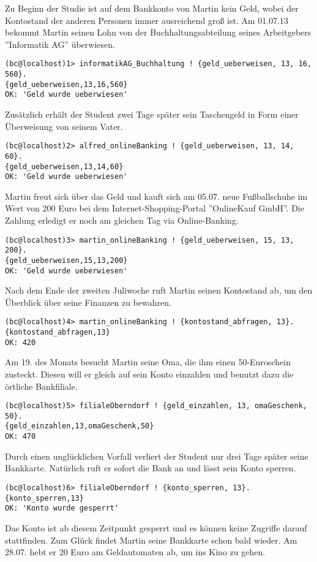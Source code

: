 Zu Beginn der Studie ist auf dem Bankkonto von Martin kein Geld, wobei der Kontostand der anderen Personen immer ausreichend groß ist. Am 01.07.13 bekommt Martin seinen Lohn von der Buchhaltungsabteilung seines Arbeitgebers ''Informatik AG'' überwiesen. 
\begin{lstlisting}
(bc@localhost)1> informatikAG_Buchhaltung ! {geld_ueberweisen, 13, 16, 560}.    
{geld_ueberweisen,13,16,560}
OK: 'Geld wurde ueberwiesen'
\end{lstlisting}
Zusätzlich erhält der Student zwei Tage später sein Taschengeld in Form einer Überweisung von seinem Vater.
\begin{lstlisting}
(bc@localhost)2> alfred_onlineBanking ! {geld_ueberweisen, 13, 14, 60}.        
{geld_ueberweisen,13,14,60}
OK: 'Geld wurde ueberwiesen'
\end{lstlisting}
Martin freut sich über das Geld und kauft sich am 05.07. neue Fußballschuhe im Wert von 200 Euro bei dem Internet-Shopping-Portal ''OnlineKauf GmbH''. Die Zahlung erledigt er noch am gleichen Tag via Online-Banking.
\begin{lstlisting}
(bc@localhost)3> martin_onlineBanking ! {geld_ueberweisen, 15, 13, 200}.        
{geld_ueberweisen,15,13,200}              
OK: 'Geld wurde ueberwiesen'
\end{lstlisting}
Nach dem Ende der zweiten Juliwoche ruft Martin seinen Kontostand ab, um den Überblick über seine Finanzen zu bewahren.
\begin{lstlisting}
(bc@localhost)4> martin_onlineBanking ! {kontostand_abfragen, 13}.         
{kontostand_abfragen,13}
OK: 420
\end{lstlisting}
Am 19. des Monats besucht Martin seine Oma, die ihm einen 50-Euroschein zusteckt. Diesen will er gleich auf sein Konto einzahlen und benutzt dazu die örtliche Bankfiliale.
\begin{lstlisting}
(bc@localhost)5> filialeOberndorf ! {geld_einzahlen, 13, omaGeschenk, 50}.
{geld_einzahlen,13,omaGeschenk,50}
OK: 470  
\end{lstlisting}
Durch einen unglücklichen Vorfall verliert der Student nur drei Tage später seine Bankkarte. Natürlich ruft er sofort die Bank an und lässt sein Konto sperren.
\begin{lstlisting}
(bc@localhost)6> filialeOberndorf ! {konto_sperren, 13}.
{konto_sperren,13}
OK: 'Konto wurde gesperrt'
\end{lstlisting}
Das Konto ist ab diesem Zeitpunkt gesperrt und es können keine Zugriffe darauf stattfinden. Zum Glück findet Martin seine Bankkarte schon bald wieder. Am 28.07. hebt er 20 Euro am Geldautomaten ab, um ins Kino zu gehen.
